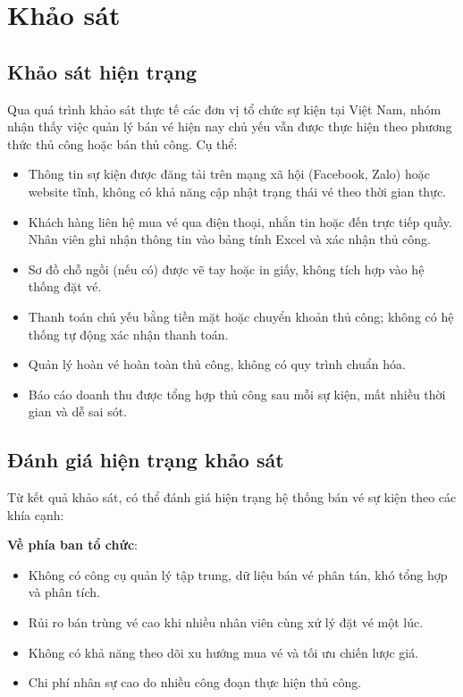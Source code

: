 \documentclass[../main.tex]{subfiles}
\begin{document}
\section{Khảo sát}

\subsection{Khảo sát hiện trạng}

Qua quá trình khảo sát thực tế các đơn vị tổ chức sự kiện tại Việt Nam, nhóm nhận thấy việc quản lý bán vé hiện nay chủ yếu vẫn được thực hiện theo phương thức thủ công hoặc bán thủ công. Cụ thể:

\begin{itemize}
    \item Thông tin sự kiện được đăng tải trên mạng xã hội (Facebook, Zalo) hoặc website tĩnh, không có khả năng cập nhật trạng thái vé theo thời gian thực.
    \item Khách hàng liên hệ mua vé qua điện thoại, nhắn tin hoặc đến trực tiếp quầy. Nhân viên ghi nhận thông tin vào bảng tính Excel và xác nhận thủ công.
    \item Sơ đồ chỗ ngồi (nếu có) được vẽ tay hoặc in giấy, không tích hợp vào hệ thống đặt vé.
    \item Thanh toán chủ yếu bằng tiền mặt hoặc chuyển khoản thủ công; không có hệ thống tự động xác nhận thanh toán.
    \item Quản lý hoàn vé hoàn toàn thủ công, không có quy trình chuẩn hóa.
    \item Báo cáo doanh thu được tổng hợp thủ công sau mỗi sự kiện, mất nhiều thời gian và dễ sai sót.
\end{itemize}

\subsection{Đánh giá hiện trạng khảo sát}

Từ kết quả khảo sát, có thể đánh giá hiện trạng hệ thống bán vé sự kiện theo các khía cạnh:

\textbf{Về phía ban tổ chức}:
\begin{itemize}
    \item Không có công cụ quản lý tập trung, dữ liệu bán vé phân tán, khó tổng hợp và phân tích.
    \item Rủi ro bán trùng vé cao khi nhiều nhân viên cùng xử lý đặt vé một lúc.
    \item Không có khả năng theo dõi xu hướng mua vé và tối ưu chiến lược giá.
    \item Chi phí nhân sự cao do nhiều công đoạn thực hiện thủ công.
\end{itemize}
\end{document}
